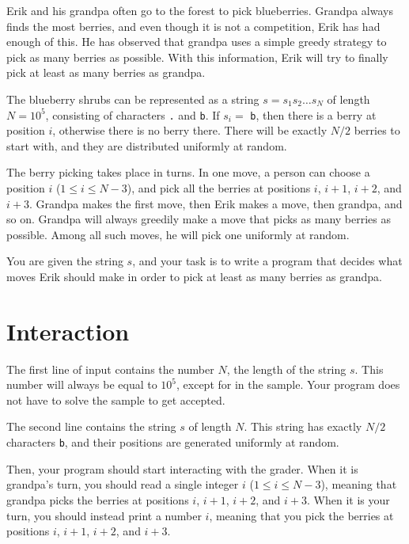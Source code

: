 
%

Erik and his grandpa often go to the forest to pick blueberries. Grandpa always finds the most berries, 
and even though it is not a competition, Erik has had enough of this. He has observed that grandpa 
uses a simple greedy strategy to pick as many berries as possible. With this information, Erik will try to 
finally pick at least as many berries as grandpa.

The blueberry shrubs can be represented as a string $s = s_1s_2 \dots s_N$ of length $N = 10^5$, consisting of characters 
\verb|.| and \verb|b|. If $s_i =$ \verb|b|, then there is a berry at position $i$, otherwise there is no 
berry there. There will be exactly $N/2$ berries to start with, and they are distributed uniformly at 
random.

The berry picking takes place in turns. In one move, a person can choose a position $i$ ($1 \leq i \leq N-3$),
and pick all the berries at positions $i$, $i+1$, $i+2$, and $i+3$. Grandpa makes the first move, then Erik makes 
a move, then grandpa, and so on. Grandpa will always greedily make a move that picks as many berries as possible.
Among all such moves, he will pick one uniformly at random.

You are given the string $s$, and your task is to write a program that decides what moves Erik should make 
in order to pick at least as many berries as grandpa.

\section*{Interaction}

The first line of input contains the number $N$, the length of the string $s$. This number will always be 
equal to $10^5$, except for in the sample. Your program does not have to solve the sample to get accepted.

The second line contains the string $s$ of length $N$. This string has exactly
$N/2$ characters \verb|b|, and their positions are generated uniformly at random.

Then, your program should start interacting with the grader. When it is grandpa's turn, you should read a 
single integer $i$ ($1 \leq i \leq N-3$), meaning that grandpa picks the berries at positions $i$, $i+1$, $i+2$, and $i+3$. When
it is your turn, you should instead print a number $i$, meaning that you pick the berries at positions $i$, $i+1$, $i+2$, and $i+3$.


